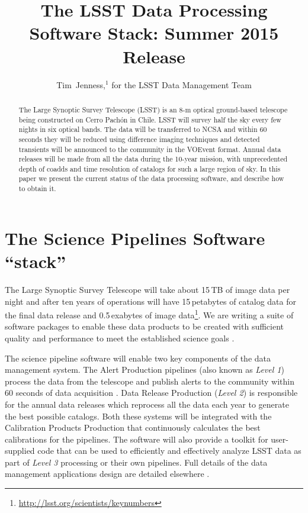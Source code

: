 \documentclass[11pt,twoside]{article}
\begin{document}
\title{The LSST Data Processing Software Stack: Summer 2015 Release}
\author{Tim~Jenness,$^1$ for the LSST Data Management Team
}


\begin{abstract}
  The Large Synoptic Survey Telescope (LSST) is an 8-m optical
  ground-based telescope being constructed on Cerro Pach\'on in
  Chile. LSST will survey half the sky every few nights in six optical
  bands. The data will be transferred to NCSA and within 60 seconds
  they will be reduced using difference imaging techniques and
  detected transients will be announced to the community in the
  VOEvent format. Annual data releases will be made from all the data
  during the 10-year mission, with unprecedented depth of coadds and
  time resolution of catalogs for such a large region of sky. In this
  paper we present the current status of the data processing software,
  and describe how to obtain it.
\end{abstract}

\section{The Science Pipelines Software ``stack''}

The Large Synoptic Survey Telescope
\citep[LSST;][]{2008arXiv0805.2366I} will take about 15\,TB of image
data per night and after ten years of operations will have
15\,petabytes of catalog data for the final data release and
0.5\,exabytes of image
data\footnote{\url{http://lsst.org/scientists/keynumbers}}. We are
writing a suite of software packages to enable these data products to
be created with sufficient quality and performance to meet the
established science goals \citep{2009arXiv0912.0201L}.

The science pipeline software will enable two key components of the data
management system. The Alert Production pipelines (also known as
\emph{Level 1}) process the data from the telescope and publish alerts
to the community within 60 seconds of data acquisition \citep{2014htu..conf...19K}. Data Release
Production (\emph{Level 2}) is responsible for the annual data
releases which reprocess all the data each year to generate the best
possible catalogs. Both these systems will be integrated with the
Calibration Products Production that continuously calculates the best
calibrations for the pipelines. The software will also provide a toolkit
for user-supplied code that can be used to efficiently and effectively
analyze LSST data as part of \emph{Level 3} processing or their own
pipelines. Full details of the data management applications design are
detailed elsewhere \citep{O3-1_adassxxv,LDM-151}.
\end{document}
